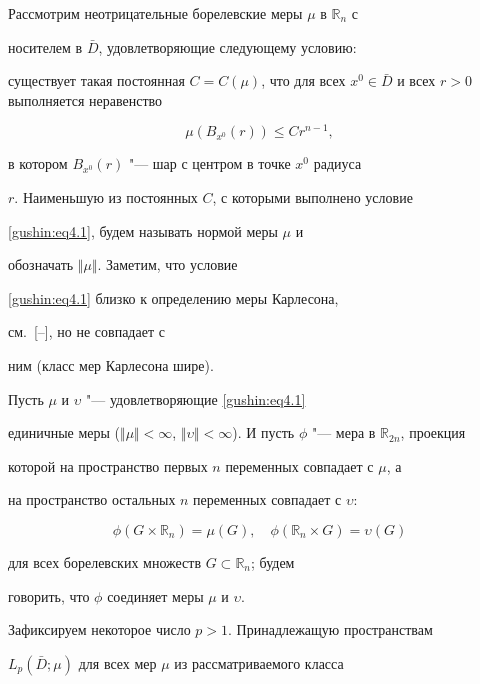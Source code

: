 Рассмотрим неотрицательные борелевские меры $\mu$ в ${\mathbb{R}}_n$ с

носителем в $\bar{D}$, удовлетворяющие следующему условию:

существует такая постоянная $C = C{(\mu)}$, что для всех $x^0 \in

\bar{D}$ и всех $r > 0$ выполняется неравенство

\begin{equation}

\label{gushin:eq4.1} \mu (B_{x^0}(r)) \leq C r^{n-1},

\end{equation}

в котором $B_{x^0}(r)$ "--- шар с центром в точке $x^0$ радиуса

$r$. Наименьшую из постоянных $C$, с которыми выполнено условие

\eqref{gushin:eq4.1}, будем называть нормой меры $\mu$ и

обозначать $\Vert\mu\Vert $. Заметим, что условие

\eqref{gushin:eq4.1} близко к определению меры Карлесона,

см.~[--], но не совпадает с

ним (класс мер Карлесона шире).



Пусть $\mu$ и $\upsilon$ "--- удовлетворяющие \eqref{gushin:eq4.1}

единичные меры ($\Vert\mu\Vert<\infty$, ${\Vert\upsilon\Vert <

\infty}$). И пусть $\phi$ "--- мера в ${\mathbb{R}}_{2n}$, проекция

которой на пространство первых $n$ переменных совпадает с $\mu$, а

на пространство остальных $n$ переменных совпадает с $\upsilon$:

$$

\phi (G \times {\mathbb{R}}_n) = \mu (G), \quad \phi ({\mathbb{R}}_n \times

G) = \upsilon (G)

$$

для всех борелевских множеств $G \subset {\mathbb{R}}_n$; будем

говорить, что $\phi$ соединяет меры $\mu$ и $\upsilon$.



Зафиксируем некоторое число $p > 1$. Принадлежащую пространствам

$L_p(\bar{D}; \mu)$ для всех мер $\mu$ из рассматриваемого класса

